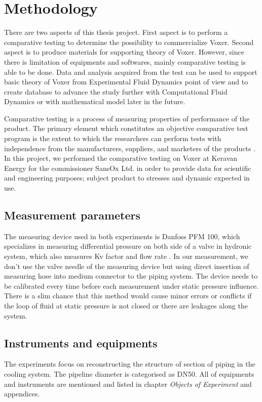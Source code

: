 
\chapter{Methodology}

There are two aspects of this thesis project. First aspect is to perform a comparative testing to determine the possibility to commercialize Voxer. Second aspect is to produce materials for supporting theory of Voxer. However, since there is limitation of equipments and softwares, mainly comparative testing is able to be done. Data and analysis acquired from the test can be used to support basic theory of Voxer from Experimental Fluid Dynamics point of view \cite{springer:book}and to create database to advance the study further with Computational Fluid Dynamics or with mathematical model later in the future.

Comparative testing is a process of measuring properties of performance of the product. The primary element which constitutes an objective comparative test program is the extent to which the researchers can perform tests with independence from the manufacturers, suppliers, and marketers of the products \cite{test:book}. In this project, we performed the comparative testing on Voxer at Keravan Energy for the commissioner SansOx Ltd. in order to provide data for scientific and engineering purposes; subject product to stresses and dynamic expected in use. 

\section{Measurement parameters}

The measuring device used in both experiments is Danfoss PFM 100, which specializes in measuring differential pressure on both side of a valve in hydronic system, which also measures Kv factor and flow rate \cite{danfoss:web}. In our measurement, we don't use the valve needle of the measuring device but using direct insertion of measuring hose into medium connector to the piping system. The device needs to be calibrated every time before each measurement under static pressure influence. There is a slim chance that this method would cause minor errors or conflicts if the loop of fluid at static pressure is not closed or there are leakages along the system. 
  
\section{Instruments and equipments}
The experiments focus on reconstructing the structure of section of piping in the cooling system. The pipeline diameter is categorised as DN50. 
All of equipments and instruments are mentioned and listed in chapter \textit{Objects of Experiment} and appendices.

\clearpage %


